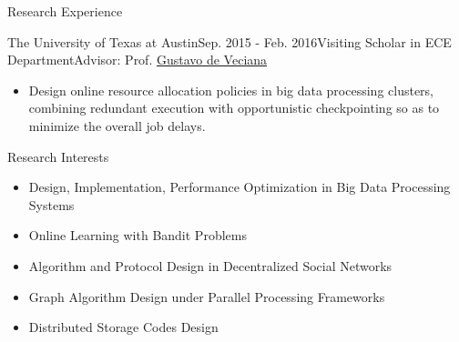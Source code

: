 \documentclass{resume} %
\begin{document}
\begin{rSection}{Research Experience}
\begin{rSubsection}{The University of Texas at Austin}{Sep. 2015 - Feb. 2016}{Visiting Scholar in ECE Department}{Advisor: Prof. \href{http://users.ece.utexas.edu/~gustavo/}
                   {Gustavo de Veciana}}
\item[]
\end{rSubsection}
\vspace{-2.5em}
\begin{itemize}
\item  Design online resource allocation policies in big data processing clusters, combining redundant execution with opportunistic checkpointing so as to minimize the overall job delays.
\end{itemize}
\end{rSection}

\begin{rSection}{Research Interests}
\begin{itemize}
\setlength{\leftmargin}{0em}
    \setlength{\itemsep}{0.2em}
    \setlength{\parskip}{0pt}
\item Design, Implementation, Performance Optimization in Big Data Processing Systems
\item Online Learning with Bandit Problems
\item Algorithm and Protocol Design in Decentralized Social Networks
\item Graph Algorithm Design under Parallel Processing Frameworks 
\item Distributed Storage Codes Design
\end{itemize}



\end{rSection}
\end{document}
